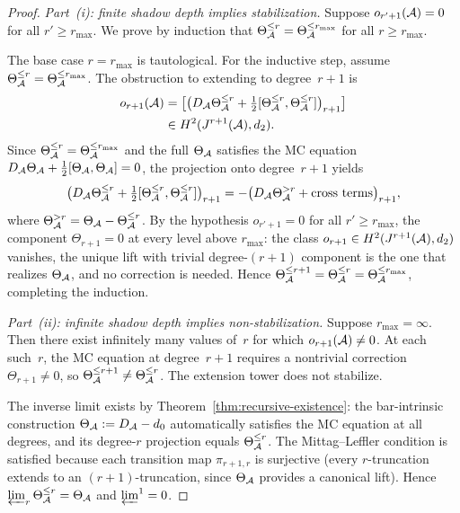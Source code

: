 \begin{proof}
\emph{Part~(i): finite shadow depth implies stabilization.}
Suppose $o_{r'+1}(\mathcal{A}) = 0$ for all $r' \geq r_{\max}$.
We prove by induction that $\Theta_{\mathcal{A}}^{\leq r} =
\Theta_{\mathcal{A}}^{\leq r_{\max}}$ for all $r \geq r_{\max}$.

The base case $r = r_{\max}$ is tautological. For
the inductive step, assume
$\Theta_{\mathcal{A}}^{\leq r} = \Theta_{\mathcal{A}}^{\leq r_{\max}}$.
The obstruction to extending to degree~$r{+}1$ is
\begin{align*}
o_{r+1}(\mathcal{A})
&= \bigl[
\bigl(D_{\mathcal{A}} \Theta_{\mathcal{A}}^{\leq r}
+ \tfrac{1}{2}
[\Theta_{\mathcal{A}}^{\leq r}, \Theta_{\mathcal{A}}^{\leq r}]
\bigr)_{r+1}
\bigr] \\
&\in H^2(J^{r+1}(\mathcal{A}), d_2).
\end{align*}
Since $\Theta_{\mathcal{A}}^{\leq r} = \Theta_{\mathcal{A}}^{\leq r_{\max}}$
and the full $\Theta_{\mathcal{A}}$ satisfies the MC equation
$D_{\mathcal{A}} \Theta_{\mathcal{A}} +
\frac{1}{2}[\Theta_{\mathcal{A}}, \Theta_{\mathcal{A}}] = 0$,
the projection onto degree~$r{+}1$ yields
\[
\bigl(D_{\mathcal{A}} \Theta_{\mathcal{A}}^{\leq r}
+ \tfrac{1}{2}
[\Theta_{\mathcal{A}}^{\leq r}, \Theta_{\mathcal{A}}^{\leq r}]
\bigr)_{r+1}
= -\bigl(D_{\mathcal{A}} \Theta_{\mathcal{A}}^{> r}
+ \text{cross terms}\bigr)_{r+1},
\]
where $\Theta_{\mathcal{A}}^{> r} = \Theta_{\mathcal{A}} -
\Theta_{\mathcal{A}}^{\leq r}$. By the hypothesis
$o_{r'+1} = 0$ for all $r' \geq r_{\max}$, the
component $\Theta_{r+1} = 0$ at every level above
$r_{\max}$: the class
$o_{r+1} \in H^2(J^{r+1}(\mathcal{A}), d_2)$
vanishes, the unique lift with trivial degree-$(r{+}1)$
component is the one that realizes $\Theta_{\mathcal{A}}$, and
no correction is needed. Hence
$\Theta_{\mathcal{A}}^{\leq r+1} = \Theta_{\mathcal{A}}^{\leq r} =
\Theta_{\mathcal{A}}^{\leq r_{\max}}$, completing the induction.

\medskip
\emph{Part~(ii): infinite shadow depth implies non-stabilization.}
Suppose $r_{\max} = \infty$. Then there exist
infinitely many values of~$r$ for which
$o_{r+1}(\mathcal{A}) \neq 0$. At each such~$r$, the MC
equation at degree~$r{+}1$ requires a nontrivial
correction $\Theta_{r+1} \neq 0$, so
$\Theta_{\mathcal{A}}^{\leq r+1} \neq \Theta_{\mathcal{A}}^{\leq r}$.
The extension tower does not stabilize.

The inverse limit exists by
Theorem~\ref{thm:recursive-existence}: the bar-intrinsic
construction $\Theta_{\mathcal{A}} := D_{\mathcal{A}} - d_0$ automatically
satisfies the MC equation at all degrees, and its
degree-$r$ projection equals $\Theta_{\mathcal{A}}^{\leq r}$.
The Mittag--Leffler condition is satisfied because each
transition map $\pi_{r+1,r}$ is surjective (every
$r$-truncation extends to an $(r{+}1)$-truncation,
since $\Theta_{\mathcal{A}}$ provides a canonical lift). Hence
$\varprojlim_r \Theta_{\mathcal{A}}^{\leq r} = \Theta_{\mathcal{A}}$
and $\varprojlim^1 = 0$.
\end{proof}

